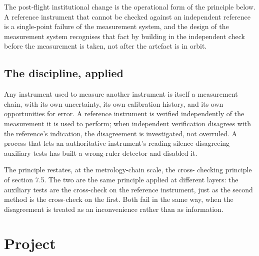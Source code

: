The post-flight institutional change is the operational form of
the principle below. A reference instrument that cannot be checked
against an independent reference is a single-point failure of the
measurement system, and the design of the measurement system
recognises that fact by building in the independent check before
the measurement is taken, not after the artefact is in orbit.

\subsection{The discipline, applied}

\begin{principle}
Any instrument used to measure another instrument is itself a
measurement chain, with its own uncertainty, its own calibration
history, and its own opportunities for error. A reference instrument
is verified independently of the measurement it is used to perform;
when independent verification disagrees with the reference's
indication, the disagreement is investigated, not overruled. A
process that lets an authoritative instrument's reading silence
disagreeing auxiliary tests has built a wrong-ruler detector and
disabled it.
\end{principle}

The principle restates, at the metrology-chain scale, the cross-
checking principle of section 7.5. The two are the same principle
applied at different layers: the auxiliary tests are the cross-check
on the reference instrument, just as the second method is the
cross-check on the first. Both fail in the same way, when the
disagreement is treated as an inconvenience rather than as
information.

\section{Project}

